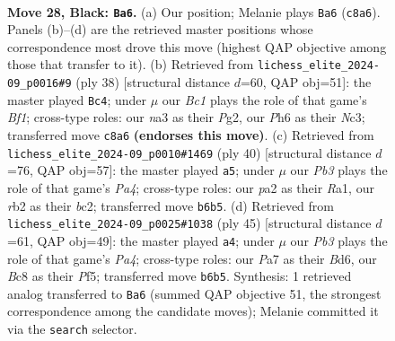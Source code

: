 \documentclass[11pt]{article}
\begin{document}
\clearpage

\begin{figure}[p]\centering
\begin{subfigure}{0.46\textwidth}\centering
\resizebox{\linewidth}{!}{%
\newchessgame
\chessboard[
  setfen={1rb2r2/p4p1k/1pB1p1pp/2n5/2P5/N1B1P2P/PR3PP1/4RK2 b - - 2 28},
  showmover=false,
  pgfstyle=straightmove, color=movearrow, markmove={c8-a6}
]}
\caption{}
\end{subfigure}\hfill
\begin{subfigure}{0.46\textwidth}\centering
\resizebox{\linewidth}{!}{%
\newchessgame
\chessboard[
  setfen={r3r1k1/pppb1pp1/2np3p/8/4PP2/P1N4P/1PPK2P1/4RB1R w - - 1 20},
  showmover=false,
  pgfstyle=straightmove, color=movearrow, markmove={f1-c4}
]}
\caption{}
\end{subfigure}
\\[4pt]
\begin{subfigure}{0.46\textwidth}\centering
\resizebox{\linewidth}{!}{%
\newchessgame
\chessboard[
  setfen={r4rk1/1p2bppp/1B2p3/1B1p4/P2P4/2P4P/1Pb2PP1/R3R1K1 w - - 1 21},
  showmover=false,
  pgfstyle=straightmove, color=movearrow, markmove={a4-a5}
]}
\caption{}
\end{subfigure}\hfill
\begin{subfigure}{0.46\textwidth}\centering
\resizebox{\linewidth}{!}{%
\newchessgame
\chessboard[
  setfen={r1b1r1k1/6pp/3b4/p2Ppp2/1pP5/6P1/1BP2PBP/R2R2K1 b - - 0 23},
  showmover=false,
  pgfstyle=straightmove, color=movearrow, markmove={a5-a4}
]}
\caption{}
\end{subfigure}
\caption{\textbf{Move 28, Black: \texttt{Ba6}.} (a) Our position; Melanie plays \texttt{Ba6} (\texttt{c8a6}). Panels (b)--(d) are the retrieved master positions whose correspondence most drove this move (highest QAP objective among those that transfer to it). (b) Retrieved from \texttt{lichess\_elite\_2024-09\_p0016\#9} (ply 38) [structural distance $d$=60, QAP obj=51]: the master played \texttt{Bc4}; under $\mu$ our \emph{Bc1} plays the role of that game's \emph{Bf1}; cross-type roles: our \emph{n}a3 as their \emph{P}g2, our \emph{P}h6 as their \emph{N}c3; transferred move \texttt{c8a6} \textbf{(endorses this move)}. (c) Retrieved from \texttt{lichess\_elite\_2024-09\_p0010\#1469} (ply 40) [structural distance $d$=76, QAP obj=57]: the master played \texttt{a5}; under $\mu$ our \emph{Pb3} plays the role of that game's \emph{Pa4}; cross-type roles: our \emph{p}a2 as their \emph{R}a1, our \emph{r}b2 as their \emph{b}c2; transferred move \texttt{b6b5}. (d) Retrieved from \texttt{lichess\_elite\_2024-09\_p0025\#1038} (ply 45) [structural distance $d$=61, QAP obj=49]: the master played \texttt{a4}; under $\mu$ our \emph{Pb3} plays the role of that game's \emph{Pa4}; cross-type roles: our \emph{P}a7 as their \emph{B}d6, our \emph{B}c8 as their \emph{P}f5; transferred move \texttt{b6b5}. Synthesis: 1 retrieved analog transferred to \texttt{Ba6} (summed QAP objective 51, the strongest correspondence among the candidate moves); Melanie committed it via the \texttt{search} selector.}
\label{fig:thought-m55}
\end{figure}
\end{document}
